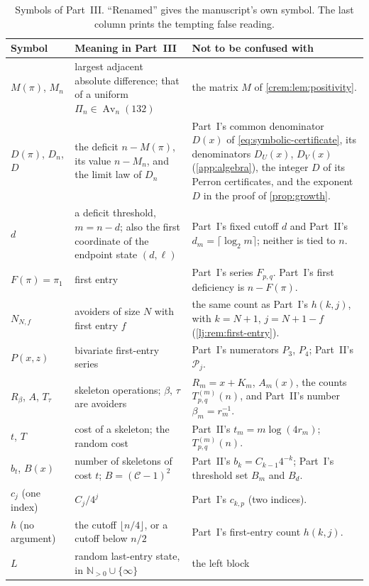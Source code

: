 \documentclass[11pt,a4paper]{article}
\theoremstyle{definition}\newaliascnt{definition}{theorem}
\theoremstyle{remark}\newaliascnt{remark}{theorem}
\newcommand{\Av}{\operatorname{Av}}
\newcommand{\Cat}{\mathcal C}
\newcommand{\N}{\mathbb N}
\begin{document}
\begin{table}[htbp]
\centering\small
\caption{Symbols of Part~III. ``Renamed'' gives the manuscript's own symbol.
The last column prints the tempting false reading.}
\label{lj:tab:notation}
\begin{tabular}{>{\raggedright}p{.19\linewidth}>{\raggedright}p{.36\linewidth}>{\raggedright\arraybackslash}p{.37\linewidth}}
\toprule
Symbol & Meaning in Part~III & Not to be confused with\\
\midrule
$M(\pi)$, $M_n$ & largest adjacent absolute difference; that of a uniform
 $\Pi_n\in\Av_n(132)$ & the matrix $M$ of \cref{crem:lem:positivity}.\\
$D(\pi)$, $D_n$, $D$ & the deficit $n-M(\pi)$, its value $n-M_n$, and the
 limit law of $D_n$ & Part~I's common denominator $D(x)$ of
 \eqref{eq:symbolic-certificate}, its denominators $D_U(x)$, $D_V(x)$
 (\cref{app:algebra}), the integer $D$ of its Perron certificates, and the
 exponent $D$ in the proof of \cref{prop:growth}.\\
$d$ & a deficit threshold, $m=n-d$; also the first coordinate of the
 endpoint state $(d,\ell)$ & Part~I's fixed cutoff $d$ and Part~II's
 $d_m=\lceil\log_2m\rceil$; neither is tied to $n$.\\
$F(\pi)=\pi_1$ & first entry & Part~I's series $F_{p,q}$. Part~I's
 first deficiency is $n-F(\pi)$.\\
$N_{N,f}$ & avoiders of size $N$ with first entry $f$ & the same count as
 Part~I's $h(k,j)$, with $k=N+1$, $j=N+1-f$ (\cref{lj:rem:first-entry}).\\
$P(x,z)$ & bivariate first-entry series & Part~I's numerators $P_3$,
 $P_4$; Part~II's $\mathcal P_j$.\\
$R_\beta$, $A$, $T_\tau$ & skeleton operations; $\beta$, $\tau$ are
 avoiders & $R_m=x+K_m$, $A_m(x)$, the counts $T^{(m)}_{p,q}(n)$, and
 Part~II's number $\beta_m=r_m^{-1}$.\\
$t$, $T$ & cost of a skeleton; the random cost & Part~II's
 $t_m=m\log(4r_m)$; $T^{(m)}_{p,q}(n)$.\\
$b_t$, $B(x)$ & number of skeletons of cost $t$; $B=(\Cat-1)^2$ &
 Part~II's $b_k=C_{k-1}4^{-k}$; Part~I's threshold set $B_m$ and $B_d$.\\
$c_j$ (one index) & $C_j/4^j$ & Part~I's $c_{k,p}$ (two indices).\\
$h$ (no argument) & the cutoff $\lfloor n/4\rfloor$, or a cutoff below
 $n/2$ & Part~I's first-entry count $h(k,j)$.\\
$L$ & random last-entry state, in $\N_{>0}\cup\{\infty\}$ & the left block

\end{tabular}
\end{table}
\end{document}
